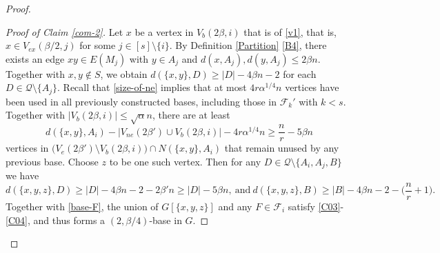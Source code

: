 \documentclass[11pt, a4paper]{article}
\theoremstyle{definition}
\newcommand{\<}{\subseteq}
\begin{document}
\begin{proof}
\begin{proof}[Proof of Claim \ref{com-2}]

Let $x$ be a vertex in $V_{b}(2\beta,i)$ that is of \ref{v1}, that is,  $x\in V_{ex}(\beta/2,j)$ for some $j\in [s]\setminus \{i\}$. By Definition \ref{Partition} \ref{B4}, there exists an edge $xy\in E(M_j)$ with $y\in A_j$ and  $d(x,A_j),d(y,A_j)\le 2\beta n$. Together with $x,y\notin S$, we obtain $d(\{x,y\},D)\ge |D|-4\beta n-2$ for each $D\in \mathcal{Q}\setminus \{A_j\}$. Recall that \eqref{size-of-ne} implies that at most  $4r\alpha^{1/4}n$ vertices have been used in all previously constructed bases, including those in $\mathcal{F}_k'$ with $k<s$. %
Together with $|V_b(2\beta, i)|\le \sqrt{\alpha} n$, there are at least
$$d(\{x,y\},A_i)-\big|V_{ne}(2\beta')\cup %
V_b(2\beta,i)\big|-4r\alpha^{1/4}n\ge \frac{n}{r}-5\beta n$$
vertices in $\big(V_{e}(2\beta')\setminus V_b(2\beta,i)\big)\cap N(\{x,y\},  A_i)$ that remain unused by any previous base. %
Choose $z$ to be one such vertex. %
Then for any $D\in \mathcal{Q}\setminus \{A_i, A_j,B\}$ we have  
$$d(\{x,y,z\},D) \ge |D|-4\beta n-2-2\beta'n\ge |D|-5\beta n,\ \text{and}\ d(\{x,y,z\},B) \ge |B|-4\beta n-2-\big(\frac{n}{r}+1\big).$$
Together with \eqref{base-F}, the union of $G[\{x,y,z\}]$ and any $F\in \mathcal{F}_i$ satisfy \ref{C03}-\ref{C04}, and thus forms a $(2,\beta/4)$-base in $G$.


\end{proof}
\end{proof}
\end{document}
